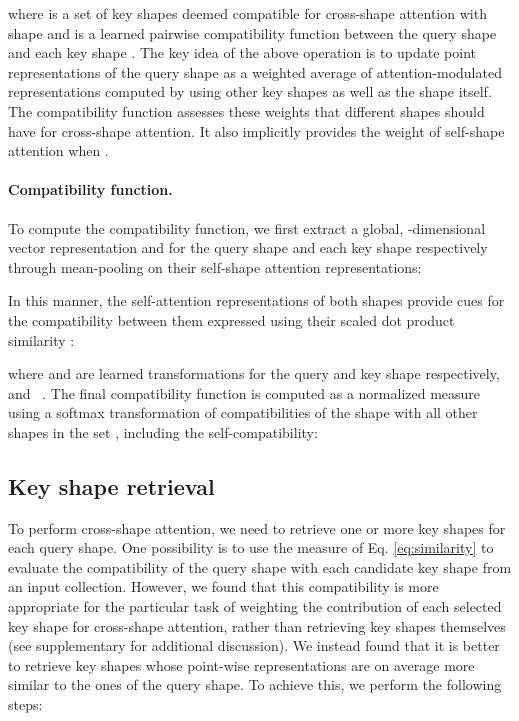 \documentclass{egpubl}
\begin{document}
where  is a set of key shapes deemed compatible for cross-shape attention with shape  and 
is a learned pairwise compatibility function between the query shape  and each key shape . The key idea of the above operation is to update point 
representations of the query shape  as a weighted average of attention-modulated representations computed by using other key shapes as well as the 
shape itself. The compatibility function  assesses these weights that different shapes should have for cross-shape attention. It
also implicitly provides the weight of self-shape attention when .

\vspace{-3mm}
\paragraph*{Compatibility function.}
To compute the compatibility function, we first extract a global, -dimensional vector representation  and  for the query shape  and each key shape  
respectively through mean-pooling on their self-shape attention representations:


In this manner, the self-attention representations of both shapes  provide cues for the compatibility between them expressed using their scaled dot product similarity
\cite{Vaswani:2017}:

\noindent where  and  are learned  transformations for the query and key shape respectively, and 
\mbox{
}. The final compatibility function  is computed as a normalized measure using a softmax transformation of compatibilities of the shape  with all
other shapes in the set , including the self-compatibility:

\subsection{Key shape retrieval}
\label{subsec:retrieval}
To perform cross-shape attention, we need to retrieve one or more key shapes for each query
shape. One possibility is to use the measure of Eq. \ref{eq:similarity} to evaluate the compatibility of the query shape with each candidate key shape from  an input collection. However, we found that this compatibility is 
more appropriate for the particular task of weighting the contribution of each selected key shape for cross-shape attention, rather than retrieving key shapes themselves (see supplementary for additional discussion). We instead found that it is  better to retrieve key shapes whose point-wise representations are on average more similar to the ones of the query shape. To achieve this, we perform the following steps: 
\end{document}
